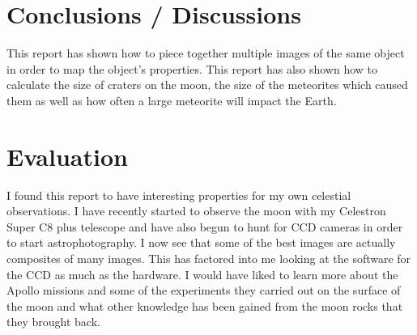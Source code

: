 \documentclass{article}
\begin{document}

\section{Conclusions / Discussions}

This report has shown how to piece together multiple images of the same object in order to map the object's 
properties. This report has also shown how to calculate the size of craters on the moon, the size of the meteorites
which caused them as well as how often a large meteorite will impact the Earth.


\section{Evaluation}

I found this report to have interesting properties for my own celestial observations. I have recently started
to observe the moon with my Celestron Super C8 plus telescope and have also begun to hunt for CCD cameras
in order to start astrophotography. I now see that some of the best images are actually composites of many 
images. This has factored into me looking at the software for the CCD as much as the hardware. I would
have liked to learn more about the Apollo missions and some of the experiments they carried out on the
surface of the moon and what other knowledge has been gained from the moon rocks that they brought back.


\end{document}
